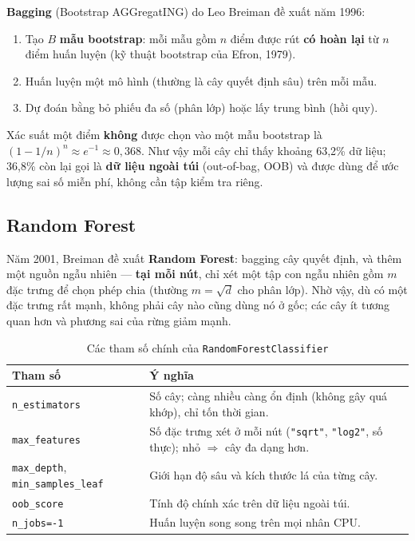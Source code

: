 \textbf{Bagging} (Bootstrap AGGregatING) do Leo Breiman đề xuất năm 1996:
\begin{enumerate}
    \item Tạo $B$ \textbf{mẫu bootstrap}: mỗi mẫu gồm $n$ điểm được rút \textbf{có hoàn lại} từ $n$ điểm huấn luyện (kỹ thuật bootstrap của Efron, 1979).
    \item Huấn luyện một mô hình (thường là cây quyết định sâu) trên mỗi mẫu.
    \item Dự đoán bằng bỏ phiếu đa số (phân lớp) hoặc lấy trung bình (hồi quy).
\end{enumerate}
Xác suất một điểm \textbf{không} được chọn vào một mẫu bootstrap là $(1 - 1/n)^n \approx e^{-1} \approx 0{,}368$. Như vậy mỗi cây chỉ thấy khoảng 63,2\% dữ liệu; 36,8\% còn lại gọi là \textbf{dữ liệu ngoài túi} (out-of-bag, OOB) và được dùng để ước lượng sai số miễn phí, không cần tập kiểm tra riêng.

\subsection{Random Forest}

Năm 2001, Breiman đề xuất \textbf{Random Forest}: bagging cây quyết định, và thêm một nguồn ngẫu nhiên --- \textbf{tại mỗi nút}, chỉ xét một tập con ngẫu nhiên gồm $m$ đặc trưng để chọn phép chia (thường $m = \sqrt{d}$ cho phân lớp). Nhờ vậy, dù có một đặc trưng rất mạnh, không phải cây nào cũng dùng nó ở gốc; các cây ít tương quan hơn và phương sai của rừng giảm mạnh.

\begin{table}[H]
\centering
\begin{tabular}{|l|p{9.5cm}|}
\hline
\textbf{Tham số} & \textbf{Ý nghĩa} \\
\hline
\texttt{n\_estimators} & Số cây; càng nhiều càng ổn định (không gây quá khớp), chỉ tốn thời gian. \\ \hline
\texttt{max\_features} & Số đặc trưng xét ở mỗi nút (\texttt{"sqrt"}, \texttt{"log2"}, số thực); nhỏ $\Rightarrow$ cây đa dạng hơn. \\ \hline
\texttt{max\_depth}, \texttt{min\_samples\_leaf} & Giới hạn độ sâu và kích thước lá của từng cây. \\ \hline
\texttt{oob\_score} & Tính độ chính xác trên dữ liệu ngoài túi. \\ \hline
\texttt{n\_jobs=-1} & Huấn luyện song song trên mọi nhân CPU. \\ \hline
\end{tabular}
\caption{Các tham số chính của \texttt{RandomForestClassifier}}
\end{table}

